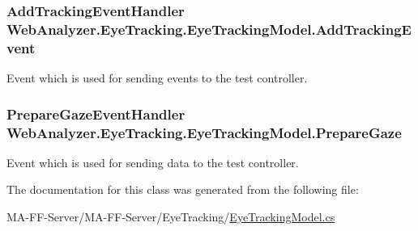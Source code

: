 \subsubsection[{Add\+Tracking\+Event}]{\setlength{\rightskip}{0pt plus 5cm}Add\+Tracking\+Event\+Handler Web\+Analyzer.\+Eye\+Tracking.\+Eye\+Tracking\+Model.\+Add\+Tracking\+Event}\label{class_web_analyzer_1_1_eye_tracking_1_1_eye_tracking_model_af9985cde00e3f6c48694b7577e2689ea}


Event which is used for sending events to the test controller. 

\hypertarget{class_web_analyzer_1_1_eye_tracking_1_1_eye_tracking_model_a170dd57ad1784737ddf34dc14f82293d}{}
\subsubsection[{Prepare\+Gaze}]{\setlength{\rightskip}{0pt plus 5cm}Prepare\+Gaze\+Event\+Handler Web\+Analyzer.\+Eye\+Tracking.\+Eye\+Tracking\+Model.\+Prepare\+Gaze}\label{class_web_analyzer_1_1_eye_tracking_1_1_eye_tracking_model_a170dd57ad1784737ddf34dc14f82293d}


Event which is used for sending data to the test controller. 



The documentation for this class was generated from the following file\+:\begin{DoxyCompactItemize}
\item 
M\+A-\/\+F\+F-\/\+Server/\+M\+A-\/\+F\+F-\/\+Server/\+Eye\+Tracking/\hyperlink{_eye_tracking_model_8cs}{Eye\+Tracking\+Model.\+cs}\end{DoxyCompactItemize}
